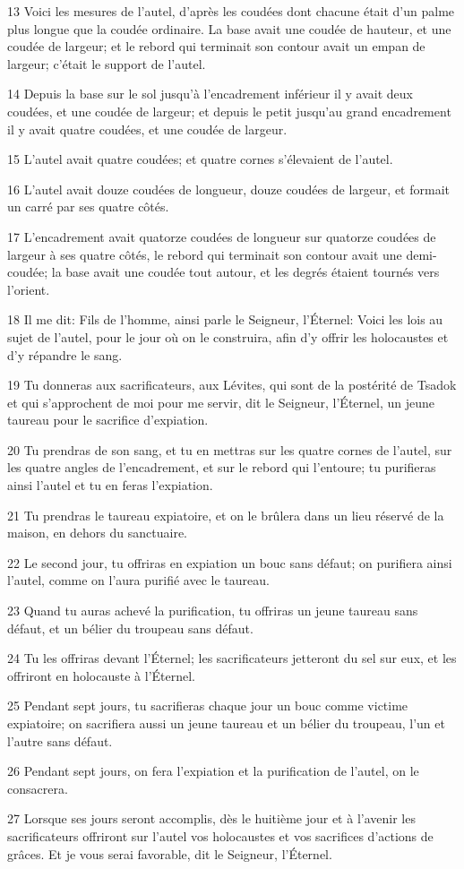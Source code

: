 \par 13 Voici les mesures de l'autel, d'après les coudées dont chacune était d'un palme plus longue que la coudée ordinaire. La base avait une coudée de hauteur, et une coudée de largeur; et le rebord qui terminait son contour avait un empan de largeur; c'était le support de l'autel.
\par 14 Depuis la base sur le sol jusqu'à l'encadrement inférieur il y avait deux coudées, et une coudée de largeur; et depuis le petit jusqu'au grand encadrement il y avait quatre coudées, et une coudée de largeur.
\par 15 L'autel avait quatre coudées; et quatre cornes s'élevaient de l'autel.
\par 16 L'autel avait douze coudées de longueur, douze coudées de largeur, et formait un carré par ses quatre côtés.
\par 17 L'encadrement avait quatorze coudées de longueur sur quatorze coudées de largeur à ses quatre côtés, le rebord qui terminait son contour avait une demi-coudée; la base avait une coudée tout autour, et les degrés étaient tournés vers l'orient.
\par 18 Il me dit: Fils de l'homme, ainsi parle le Seigneur, l'Éternel: Voici les lois au sujet de l'autel, pour le jour où on le construira, afin d'y offrir les holocaustes et d'y répandre le sang.
\par 19 Tu donneras aux sacrificateurs, aux Lévites, qui sont de la postérité de Tsadok et qui s'approchent de moi pour me servir, dit le Seigneur, l'Éternel, un jeune taureau pour le sacrifice d'expiation.
\par 20 Tu prendras de son sang, et tu en mettras sur les quatre cornes de l'autel, sur les quatre angles de l'encadrement, et sur le rebord qui l'entoure; tu purifieras ainsi l'autel et tu en feras l'expiation.
\par 21 Tu prendras le taureau expiatoire, et on le brûlera dans un lieu réservé de la maison, en dehors du sanctuaire.
\par 22 Le second jour, tu offriras en expiation un bouc sans défaut; on purifiera ainsi l'autel, comme on l'aura purifié avec le taureau.
\par 23 Quand tu auras achevé la purification, tu offriras un jeune taureau sans défaut, et un bélier du troupeau sans défaut.
\par 24 Tu les offriras devant l'Éternel; les sacrificateurs jetteront du sel sur eux, et les offriront en holocauste à l'Éternel.
\par 25 Pendant sept jours, tu sacrifieras chaque jour un bouc comme victime expiatoire; on sacrifiera aussi un jeune taureau et un bélier du troupeau, l'un et l'autre sans défaut.
\par 26 Pendant sept jours, on fera l'expiation et la purification de l'autel, on le consacrera.
\par 27 Lorsque ses jours seront accomplis, dès le huitième jour et à l'avenir les sacrificateurs offriront sur l'autel vos holocaustes et vos sacrifices d'actions de grâces. Et je vous serai favorable, dit le Seigneur, l'Éternel.

